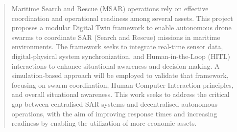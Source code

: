 \begin{abstract}
    Maritime Search and Rescue (MSAR) operations rely on effective coordination and operational readiness among several assets.
    This project proposes a modular Digital Twin framework to enable autonomous drone swarms to coordinate SAR (Search and Rescue) missions in maritime environments.
    The framework seeks to integrate real-time sensor data, digital-physical system synchronization, and Human-in-the-Loop (HITL) interactions to enhance situational awareness and decision-making.
    A simulation-based approach will be employed to validate that framework, focusing on swarm coordination, Human-Computer Interaction principles, and overall situational awareness.
    This work seeks to address the critical gap between centralised SAR systems and decentralised autonomous operations, with the aim of improving response times and increasing readiness by enabling the utilization of more economic assets.
\end{abstract}
